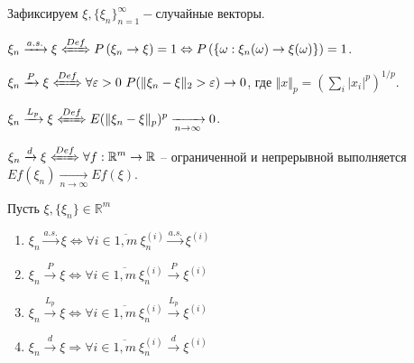 
Зафиксируем $\displaystyle \xi ,\{\xi _{n}\}_{n=1}^{\infty } -$случайные векторы.

\begin{definition}
	$\displaystyle \xi _{n}\xrightarrow{a.s.} \xi \xLeftrightarrow{Def} P\left( \xi _{n}\rightarrow \xi \right) =1\Leftrightarrow P\left(\left\{\omega :\xi _{n}( \omega )\rightarrow \xi ( \omega )\right\}\right) = 1$.
\end{definition}

\begin{definition}
	$\displaystyle \xi _{n}\xrightarrow{P} \xi \xLeftrightarrow{Def} \forall \varepsilon  >0\ P(\Vert \xi _{n} -\xi \Vert _{2}  >\varepsilon )\rightarrow 0$, где $\displaystyle \Vert x\Vert _{p} =\left(\sum _{i}| x_{i}| ^{p}\right)^{1/p}$.
\end{definition}

\begin{definition}
	$\displaystyle \xi _{n}\xrightarrow{L_{p}} \xi \xLeftrightarrow{Def} E(\Vert \xi _{n} -\xi \Vert _{p})^{p}\xrightarrow[n\rightarrow \infty ]{} 0$.
\end{definition}

\begin{definition}
	$\displaystyle \xi _{n}\xrightarrow{d} \xi \xLeftrightarrow{Def} \forall f:\mathbb{R}^{m}\rightarrow \mathbb{R}$ -- ограниченной и непрерывной выполняется $\displaystyle Ef( \xi _{n})\xrightarrow[n\rightarrow \infty ]{} Ef( \xi )$.
\end{definition}
\begin{proposition}
	Пусть $\displaystyle \xi ,\{\xi _{n}\} \in \mathbb{R}^{m}$
	
	\begin{enumerate}
		\item $\displaystyle \xi _{n}\xrightarrow{a.s.} \xi \Leftrightarrow \forall i\in \overline{1,m} \ \xi _{n}^{( i)}\xrightarrow{a.s.} \xi ^{( i)}$
		
		\item $\displaystyle \xi _{n}\xrightarrow{P} \xi \Leftrightarrow \forall i\in \overline{1,m} \ \xi _{n}^{( i)}\xrightarrow{P} \xi ^{( i)}$
		
		\item $\displaystyle \xi _{n}\xrightarrow{L_{p}} \xi \Leftrightarrow \forall i\in \overline{1,m} \ \xi _{n}^{( i)}\xrightarrow{L_{p}} \xi ^{( i)}$
		
		\item $\displaystyle \xi _{n}\xrightarrow{d} \xi \Rightarrow \forall i\in \overline{1,m} \ \xi _{n}^{( i)}\xrightarrow{d} \xi ^{( i)}$
	\end{enumerate}
	
\end{proposition}

